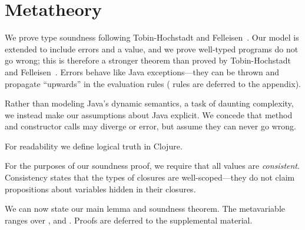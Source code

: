 \chapter{Metatheory}
\label{sec:metatheory}

We prove type soundness following Tobin-Hochstadt and Felleisen~\cite{TF10}.  Our model is extended
to include errors \errorvalv{} and a \wrong{} value, and we prove well-typed
programs do not go wrong; this is therefore a stronger theorem than
proved by Tobin-Hochstadt and Felleisen~\cite{TF10}. 
Errors behave like Java exceptions---they can be thrown and propagate ``upwards'' in the evaluation rules
(\errorvalv{} rules are deferred to the appendix).

Rather than modeling Java's dynamic semantics, a task of daunting
complexity, we instead make our assumptions about Java explicit. We
concede that method and constructor calls may diverge or error, but
assume they can never go wrong.

{}

For readability we define logical truth in Clojure.

{}

For the purposes of our soundness proof, we require that all values
are \emph{consistent}.  Consistency 
states that the types of closures are well-scoped---they do
not claim propositions about variables hidden in their closures.

{}

We can now state our main lemma and soundness theorem.  The
metavariable  ranges over \val{}, \errorvalv{} and
\wrong{}. Proofs are deferred to the supplemental material. %

\begin{lemma}\label{main:lemma:soundness}

  {\soundnesslemmahypothesis}
\end{lemma}


{}

{}

